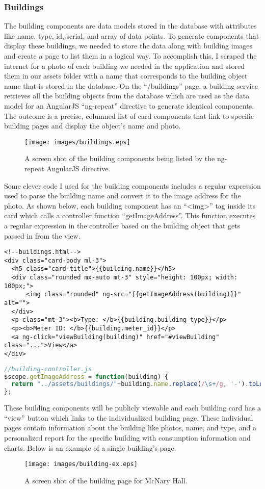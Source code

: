 \documentclass[letterpaper,10pt,serif,draftclsnofoot,onecolumn,compsoc,titlepage]{IEEEtran}
\begin{document}
\subsubsection{Buildings}
The building components are data models stored in the database with attributes like name, type, id, serial, and array of data points. To generate components that display these buildings, we needed to store the data along with building images and create a page to list them in a logical way. To accomplish this, I scraped the internet for a photo of each building we needed in the application and stored them in our assets folder with a name that corresponds to the building object name that is stored in the database. On the ``/buildings'' page, a building service retrieves all the building objects from the database which are used as the data model for an AngularJS ``ng-repeat'' directive to generate identical components. The outcome is a precise, columned list of card components that link to specific building pages and display the object's name and photo. 
\begin{figure}[H]
  \centering
  \texttt{[image: images/buildings.eps]}
  \caption{A screen shot of the building components being listed by the ng-repeat AngularJS directive.}
\end{figure}
Some clever code I used for the building components includes a regular expression used to parse the building name and convert it to the image address for the photo. As shown below, each building component has an ``\textless img\textgreater'' tag inside its card which calls a controller function ``getImageAddress''. This function executes a regular expression in the controller based on the building object that gets passed in from the view.
\begin{lstlisting}[language=HTML5]
<!--buildings.html-->
<div class="card-body ml-3">
  <h5 class="card-title">{{building.name}}</h5>
  <div class="rounded mx-auto mt-3" style="height: 100px; width: 100px;">
      <img class="rounded" ng-src="{{getImageAddress(building)}}" alt="">
  </div>
  <p class="mt-3"><b>Type: </b>{{building.building_type}}</p>
  <p><b>Meter ID: </b>{{building.meter_id}}</p>
  <a ng-click="viewBuilding(building)" href="#viewBuilding" class="...">View</a>
</div>
\end{lstlisting}
\begin{lstlisting}[language=JavaScript]
//building-controller.js
$scope.getImageAddress = function(building) {
  return "../assets/buildings/"+building.name.replace(/\s+/g, '-').toLowerCase()+".jpg";
};
\end{lstlisting}
These building components will be publicly viewable and each building card has a ``view'' button which links to the individualized building page. These individual pages contain information about the building like photos, name, and type, and a personalized report for the specific building with consumption information and charts. Below is an example of a single building's page.
\begin{figure}[H]
  \centering
  \texttt{[image: images/building-ex.eps]}
  \caption{A screen shot of the building page for McNary Hall.}
\end{figure}
\end{document}
